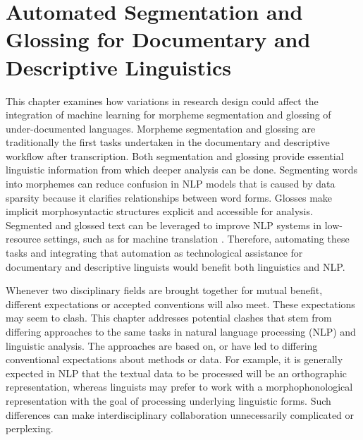 \chapter{Automated Segmentation and Glossing for Documentary and Descriptive Linguistics}
\label{chap:seggloss}

This chapter examines how variations in research design could affect the integration of machine learning for morpheme segmentation and glossing of under-documented languages. Morpheme segmentation and glossing are traditionally the first tasks undertaken in the documentary and descriptive workflow after transcription. Both segmentation and glossing provide essential linguistic information from which deeper analysis can be done. Segmenting words into morphemes can reduce confusion in NLP models that is caused by data sparsity because it clarifies relationships between word forms. Glosses make implicit morphosyntactic structures explicit and accessible for analysis. Segmented and glossed text can be leveraged to improve NLP systems in low-resource settings, such as for machine translation \citep{shearing_improving_2018,zhou_using_2020}. Therefore, automating these tasks and integrating that automation as technological assistance for documentary and descriptive linguists would benefit both linguistics and NLP.

Whenever two disciplinary fields are brought together for mutual benefit, different expectations or accepted conventions will also meet. These expectations may seem to clash. This chapter addresses potential clashes that stem from differing approaches to the same tasks in natural language processing (NLP) and linguistic analysis. The approaches are based on, or have led to differing conventional expectations about methods or data. For example, it is generally expected in NLP that the textual data to be processed will be an orthographic representation, whereas linguists may prefer to work with a  morphophonological representation with the goal of processing underlying linguistic forms. Such differences can make interdisciplinary collaboration unnecessarily complicated or perplexing. 

